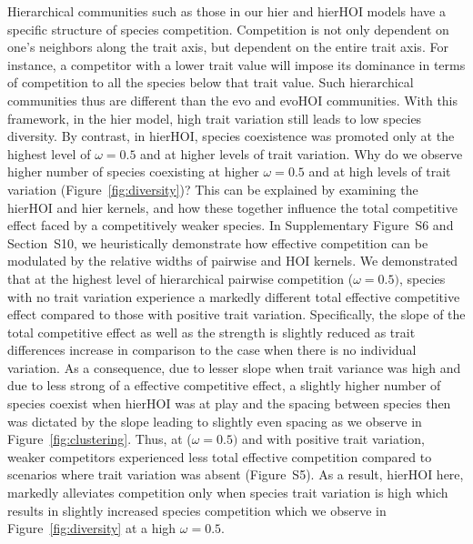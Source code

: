\documentclass[11pt]{article}
\newcommand{\SI}{Supplementary}
\begin{document}
Hierarchical communities such as those in our hier and hierHOI models have a specific structure of species competition. Competition is not only dependent on one's neighbors along the trait axis, but dependent on the entire trait axis. For instance, a competitor with a lower trait value will impose its dominance in terms of competition to all the species below that trait value. Such hierarchical communities thus are different than the evo and evoHOI communities. With this framework, in the hier model, high trait variation still leads to low species diversity. By contrast, in hierHOI, species coexistence was promoted only at the highest level of $\omega = 0.5$ and at higher levels of trait variation. Why do we observe higher number of species coexisting at higher $\omega = 0.5$ and at high levels of trait variation (Figure~\ref{fig:diversity})? This can be explained by examining the hierHOI and hier kernels, and how these together influence the total competitive effect faced by a competitively weaker species. In \SI{} Figure~S6 and Section~S10, we heuristically demonstrate how effective competition can be modulated by the relative widths of pairwise and HOI kernels. We demonstrated that at the highest level of hierarchical pairwise competition ($\omega=0.5)$, species with no trait variation experience a markedly different total effective competitive effect compared to those with positive trait variation. Specifically, the slope of the total competitive effect as well as the strength is slightly reduced as trait differences increase in comparison to the case when there is no individual variation. As a consequence, due to lesser slope when trait variance was high and due to less strong of a effective competitive effect, a slightly higher number of species coexist when hierHOI was at play and the spacing between species then was dictated by the slope leading to slightly even spacing as we observe in Figure~\ref{fig:clustering}. Thus, at ($\omega=0.5)$ and with positive trait variation, weaker competitors experienced less total effective competition compared to scenarios where trait variation was absent (Figure~S5). As a result, hierHOI here, markedly alleviates competition only when species trait variation is high which results in slightly increased species competition which we observe in Figure~\ref{fig:diversity} at a high $\omega = 0.5$.  
 
\end{document}

